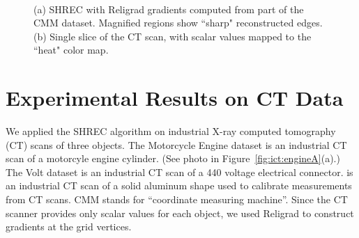 \begin{figure}[t]
	\centering
	\\
	\caption{(a) SHREC with Religrad gradients computed from part of the CMM dataset. Magnified regions show ``sharp" reconstructed edges. (b) Single slice of the CT scan, with scalar values mapped to the ``heat" color map.}\label{fig:ict:CMM}
\end{figure}

\section{Experimental Results on CT Data}

We applied the SHREC algorithm on industrial X-ray computed tomography (CT)
scans of three objects.
The Motorcycle Engine dataset is an industrial CT scan 
of a motorcyle engine cylinder.
(See photo in Figure~\ref{fig:ict:engineA}(a).)
The Volt dataset is an industrial CT scan 
of a 440 voltage electrical connector.
is an industrial CT scan of a solid aluminum shape
used to calibrate measurements from CT scans.
CMM stands for ``coordinate measuring machine''.
Since the CT scanner provides only scalar values for each object,
we used Religrad to construct gradients at the grid vertices.

